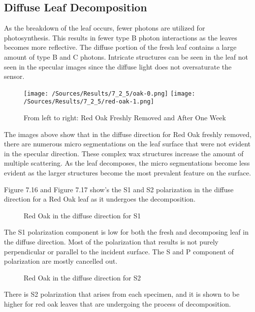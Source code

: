\subsection{Diffuse Leaf Decomposition}
As the breakdown of the leaf occurs, fewer photons are utilized for photosynthesis.  This results in fewer type B photon interactions as the leaves becomes more reflective.  The diffuse portion of the fresh leaf contains a large amount of type B and C photons.  Intricate structures can be seen in the leaf not seen in the specular images since the diffuse light does not oversaturate the sensor.
%
\begin{figure}[htp]
    \centering
    \hspace*{\fill}%
    \texttt{[image: /Sources/Results/7\_2\_5/oak-0.png]}\hfill%
    \texttt{[image: /Sources/Results/7\_2\_5/red-oak-1.png]}
    \hspace*{\fill}%
    \caption{From left to right: Red Oak Freshly Removed and After One Week}
    \label{fig:specular-raw-decompose}
\end{figure}
%
The images above show that in the diffuse direction for Red Oak freshly removed, there are numerous micro segmentations on the leaf surface that were not evident in the specular direction.  These complex wax structures increase the amount of multiple scattering.  As the leaf decomposes, the micro segmentations become less evident as the larger structures become the most prevalent feature on the surface.

Figure 7.16 and Figure 7.17 show's the S1 and S2 polarization in the diffuse direction for a Red Oak leaf as it undergoes the decomposition.
%
\begin{sidewaysfigure}
    \begin{center}
    \end{center}
    \caption{Red Oak in the diffuse direction for S1}
    \label{fig:polarization}
\end{sidewaysfigure}
%
The S1 polarization component is low for both the fresh and decomposing leaf in the diffuse direction.  Most of the polarization that results is not purely perpendicular or parallel to the incident surface.  The S and P component of polarization are mostly cancelled out.
%
\begin{sidewaysfigure}
    \begin{center}
    \end{center}
    \caption{Red Oak in the diffuse direction for S2}
    \label{fig:polarization}
\end{sidewaysfigure}
%
There is S2 polarization that arises from each specimen, and it is shown to be higher for red oak leaves that are undergoing the process of decomposition.

